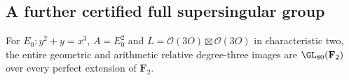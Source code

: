 \subsection{A further certified full supersingular group}
\label{subsec:ss-product-degree-three-full}

\begin{theorem}\label{thm:ss-product-degree-three-full-group}
For $E_0:y^2+y=x^3$, $A=E_0^2$ and
$L=\mathcal O(3O)\boxtimes\mathcal O(3O)$ in characteristic two, the
entire geometric and arithmetic relative degree-three images are
$\GL_{80}(\mathbf F_2)$ over every perfect extension of $\mathbf F_2$.
\end{theorem}

